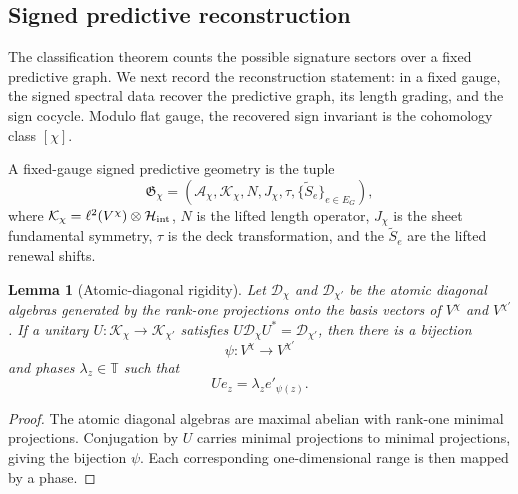 \documentclass[11pt]{article}
\newtheorem{lemma}[theorem]{Lemma}
\theoremstyle{definition}
\theoremstyle{remark}
\newcommand{\T}{\mathbb{T}}
\newcommand{\Hh}{\mathcal{H}}
\newcommand{\Kh}{\mathcal{K}}
\newcommand{\Dd}{\mathcal{D}}
\begin{document}
\subsection{Signed predictive reconstruction}
\label{sec:reconstruction}

The classification theorem counts the possible signature sectors over a fixed
predictive graph.  We next record the reconstruction statement: in a fixed
gauge, the signed spectral data recover the predictive graph, its length
grading, and the sign cocycle.  Modulo flat gauge, the recovered sign invariant
is the cohomology class $[\chi]$.

A fixed-gauge signed predictive geometry is the tuple
\[
  \mathfrak G_\chi=
  (\mathcal A_\chi,\Kh_\chi,N,J_\chi,\tau,\{\widetilde S_e\}_{e\in E_G}),
\]
where $\Kh_\chi=\ell^2(V^\chi)\otimes\Hh_{\rm int}$, $N$ is the lifted length
operator, $J_\chi$ is the sheet fundamental symmetry, $\tau$ is the deck
transformation, and the $\widetilde S_e$ are the lifted renewal shifts.

\begin{lemma}[Atomic-diagonal rigidity]
\label{lem:atom}
Let $\Dd_\chi$ and $\Dd_{\chi'}$ be the atomic diagonal algebras generated by
the rank-one projections onto the basis vectors of $V^\chi$ and
$V^{\chi'}$.  If a unitary $U:\Kh_\chi\to\Kh_{\chi'}$ satisfies
$U\Dd_\chi U^*=\Dd_{\chi'}$, then there is a bijection
\[
  \psi:V^\chi\longrightarrow V^{\chi'}
\]
and phases $\lambda_z\in\T$ such that
\[
  Ue_z=\lambda_z e'_{\psi(z)} .
\]
\end{lemma}

\begin{proof}
The atomic diagonal algebras are maximal abelian with rank-one minimal
projections.  Conjugation by $U$ carries minimal projections to minimal
projections, giving the bijection $\psi$.  Each corresponding one-dimensional
range is then mapped by a phase.
\end{proof}
\end{document}
